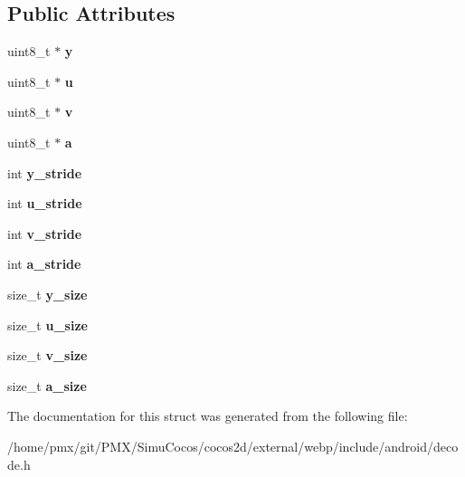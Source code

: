 \subsection*{Public Attributes}
\begin{DoxyCompactItemize}
\item 
\mbox{\label{structWebPYUVABuffer_ac5825b3f5ecfbbb9448e853a044b6f83}} 
uint8\+\_\+t $\ast$ {\bfseries y}
\item 
\mbox{\label{structWebPYUVABuffer_a6d856cfdedd47b15e8f59ed88e331030}} 
uint8\+\_\+t $\ast$ {\bfseries u}
\item 
\mbox{\label{structWebPYUVABuffer_a8a9a660a026e1e75202984b79f7dd7a3}} 
uint8\+\_\+t $\ast$ {\bfseries v}
\item 
\mbox{\label{structWebPYUVABuffer_ad211dd3ea4fd3d129995e7a9d1bf2594}} 
uint8\+\_\+t $\ast$ {\bfseries a}
\item 
\mbox{\label{structWebPYUVABuffer_a8dc1351e8df61c8047f66a925c146f1a}} 
int {\bfseries y\+\_\+stride}
\item 
\mbox{\label{structWebPYUVABuffer_a9a70e1b48e90f32199afb44a91f1b289}} 
int {\bfseries u\+\_\+stride}
\item 
\mbox{\label{structWebPYUVABuffer_a4a47db587f41dbf943e73d897a4556c5}} 
int {\bfseries v\+\_\+stride}
\item 
\mbox{\label{structWebPYUVABuffer_abe0f9157f126938a5081c5fd3ee88a9d}} 
int {\bfseries a\+\_\+stride}
\item 
\mbox{\label{structWebPYUVABuffer_a4e21661401eea84896b113018cf00592}} 
size\+\_\+t {\bfseries y\+\_\+size}
\item 
\mbox{\label{structWebPYUVABuffer_ae2dae1248a056f7753e218d0b2265f9b}} 
size\+\_\+t {\bfseries u\+\_\+size}
\item 
\mbox{\label{structWebPYUVABuffer_a8f87e462581975a52d690143a60c9143}} 
size\+\_\+t {\bfseries v\+\_\+size}
\item 
\mbox{\label{structWebPYUVABuffer_a1b229bd6f211fb1c579ec6ce26837aeb}} 
size\+\_\+t {\bfseries a\+\_\+size}
\end{DoxyCompactItemize}


The documentation for this struct was generated from the following file\+:\begin{DoxyCompactItemize}
\item 
/home/pmx/git/\+P\+M\+X/\+Simu\+Cocos/cocos2d/external/webp/include/android/decode.\+h\end{DoxyCompactItemize}
